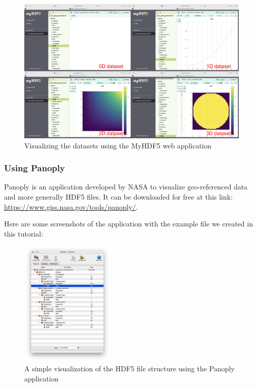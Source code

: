 \documentclass{article}
\begin{document}
\begin{figure}[H]
    \centering
    \includegraphics[width=\textwidth]{img/MyHDF5_visualizer.png}
    \caption{Visualizing the datasets using the MyHDF5 web application} 
    \label{fig:my_hdf5_datasets}
\end{figure}

\subsubsection{Using Panoply}

Panoply is an application developed by NASA to visualize geo-referenced data and more generally HDF5 files. It can be downloaded for free at this link: \url{https://www.giss.nasa.gov/tools/panoply/}. 

Here are some screenshots of the application with the example file we created in this tutorial: 

\begin{figure}[H]
    \centering
    \includegraphics[width=0.4\textwidth]{img/Panoply_developed_structure.png}
    \caption{A simple visualization of the HDF5 file structure using the Panoply application} 
    \label{fig:panoply_developed_structure}
\end{figure}
\end{document}
